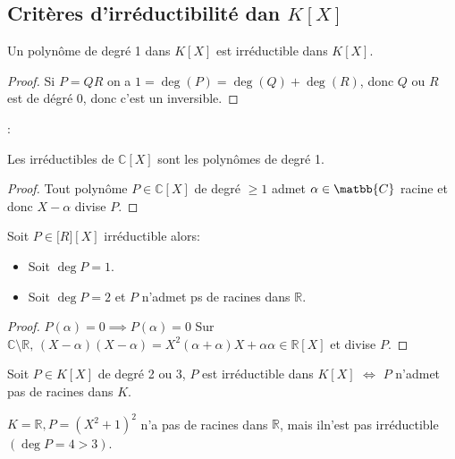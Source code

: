 \subsection{Critères d'irréductibilité dan $K[X]$}


\begin{prop}
	Un polynôme de degré 1 dans $K[X]$ est irréductible dans $K[X]$.
\end{prop}

\begin{proof}
	Si $P = QR$ on a $ 1 = \deg(P) = \deg(Q) + \deg(R)$, donc $Q$ ou $R$ est de dégré 0, donc c'est un inversible.
\end{proof}:


\begin{theorem}
	Les irréductibles de $\mathbb{C}[X]$ sont les polynômes de degré 1.
\end{theorem}


\begin{proof}
	Tout polynôme $P\in \mathbb{C}[X]$ de degré $\geq 1$ admet $\alpha\in \matbb{C}$ racine et donc $X-\alpha$ divise $P$.
\end{proof}



\begin{prop}
	Soit $P \in \mathbb[R][X]$ irréductible alors:
	\begin{itemize}
		\item Soit $\deg P = 1$.
		\item Soit $\deg P = 2$ et $P$ n'admet ps de racines dans $\mathbb{R}$.
	\end{itemize}
\end{prop}


\begin{proof}
	$P(\alpha) = 0 \implies P(\alpha) = 0$ %
	Sur $\mathbb{C} \setminus \mathbb{R}, \, (X- \alpha) (X- \alpha) = X ^2(\alpha + \alpha)X + \alpha\alpha \in \mathbb{R}[X]$ %
	et divise $P$.
\end{proof}



\begin{prop}
	Soit $P \in K[X]$ de degré 2 ou 3,
	$P$ est irréductible dans $K[X]$ $\iff$ $P$ n'admet pas de racines dans $K$.
\end{prop}


\begin{exemple}
	$K = \mathbb{R}, P = (X^2 + 1 )^2$ n'a pas de racines dans $\mathbb{R}$, mais iln'est pas irréductible $(\deg P = 4 > 3)$.
\end{exemple}

